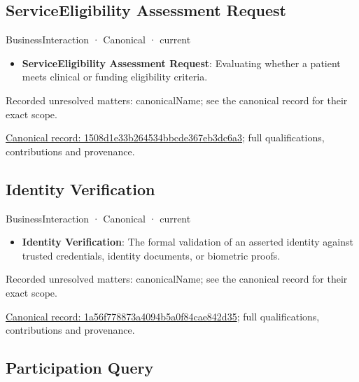 \subsection{ServiceEligibility Assessment Request}

\label{element:1508d1e33b264534bbcde367eb3dc6a3}
{\small BusinessInteraction · Canonical · current}\par

\begin{itemize}


\item \textbf{ServiceEligibility Assessment Request}: Evaluating whether a patient meets clinical or funding eligibility criteria.

\end{itemize}

{\small Recorded unresolved matters: canonicalName; see the canonical record for their exact scope.}\par
{\footnotesize \href{../../../../continuum/business/business-interaction/1508d1e33b264534bbcde367eb3dc6a3.md}{Canonical record: 1508d1e33b264534bbcde367eb3dc6a3}; full qualifications, contributions and provenance.}\par
\subsection{Identity Verification}

\label{element:1a56f778873a4094b5a0f84cae842d35}
{\small BusinessInteraction · Canonical · current}\par

\begin{itemize}


\item \textbf{Identity Verification}: The formal validation of an asserted identity against trusted credentials, identity documents, or biometric proofs.

\end{itemize}

{\small Recorded unresolved matters: canonicalName; see the canonical record for their exact scope.}\par
{\footnotesize \href{../../../../continuum/business/business-interaction/1a56f778873a4094b5a0f84cae842d35.md}{Canonical record: 1a56f778873a4094b5a0f84cae842d35}; full qualifications, contributions and provenance.}\par
\subsection{Participation Query}

